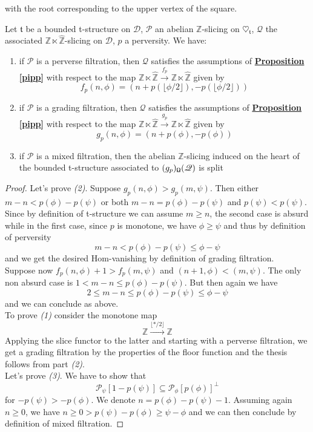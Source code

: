 with the root corresponding to the upper vertex of the square. 

\begin{prop}\label{grad}
Let $\mathfrak{t}$ be a bounded t-structure on $\mathscr{D}$, $\mathscr{P}$ an abelian $\mathbb{Z}$-slicing on $\heartsuit_{\mathfrak{t}}$, $\mathscr{Q}$ the associated $\mathbb{Z} \ltimes \hat{\mathbb{Z}}$-slicing on $\mathscr{D}$, $p$ a perversity. We have: 
\begin{enumerate}
\item if $\mathscr{P}$ is a perverse filtration, then $\mathscr{Q}$ satisfies the assumptions of \hyperref[pipp]{\textbf{Proposition \ref*{pipp}}} with respect to the map $\mathbb{Z} \ltimes \hat{\mathbb{Z}} \overset{f_p}{\longrightarrow} \mathbb{Z} \ltimes \hat{\mathbb{Z}}$ given by $$f_p(n,\phi)=(n+p(\lfloor \phi / 2 \rfloor),-p(\lfloor \phi / 2 \rfloor))$$ 
\item if $\mathscr{P}$ is a grading filtration, then $\mathscr{Q}$ satisfies the assumptions of \hyperref[pipp]{\textbf{Proposition \ref*{pipp}}} with respect to the map $\mathbb{Z} \ltimes \hat{\mathbb{Z}} \overset{g_p}{\longrightarrow} \mathbb{Z} \ltimes \hat{\mathbb{Z}}$ given by $$g_p(n,\phi)=(n+p(\phi),-p(\phi))$$ 
\item if $\mathscr{P}$ is a mixed filtration, then the abelian $\mathbb{Z}$-slicing induced on the heart of the bounded t-structure associated to $(g_p)_{\textnormal{\Libra}}(\mathscr{Q})$ is split 
\end{enumerate}
\end{prop}

\begin{proof}
Let's prove \textit{(2)}. Suppose $g_p(n,\phi) > g_p(m,\psi)$. Then either $m-n< p(\phi) - p(\psi)$ or both $m-n = p(\phi) - p(\psi)$ and $p(\psi) < p(\psi)$. Since by definition of t-structure we can assume $m \ge n$, the second case is absurd while in the first case, since $p$ is monotone, we have $\phi \ge \psi$ and thus by definition of perversity $$m-n<p(\phi)-p(\psi) \le \phi - \psi$$ 
and we get the desired Hom-vanishing by definition of grading filtration. \\

Suppose now $f_p(n,\phi) + 1 > f_p(m,\psi)$ and $(n+1,\phi) < (m,\psi)$. The only non absurd case is $ 1<m-n \le  p(\phi) - p(\psi)$. But then again we have $$2 \le m-n \le p(\phi)-p(\psi) \le \phi - \psi$$
and we can conclude as above. \\

To prove \textit{(1)} consider the monotone map $$\mathbb{Z} \overset{\lfloor * / 2 \rfloor}{\longrightarrow} \mathbb{Z}$$
Applying the slice functor to the latter and starting with a perverse filtration, we get a grading filtration by the properties of the floor function and the thesis follows from part \textit{(2)}. \\ 

Let's prove \textit{(3)}. We have to show that $$\mathscr{P}_{\psi}[1-p(\psi)] \subseteq \mathscr{P}_{\phi }[p(\phi)]^{\perp}$$ 
for $-p(\psi)>-p(\phi)$. We denote $n=p(\phi)-p(\psi)-1$. Assuming again $n \ge 0$, we have $n \ge 0 > p(\psi) - p(\phi) \ge \psi - \phi$ and we can then conclude by definition of mixed filtration. 
\end{proof}


